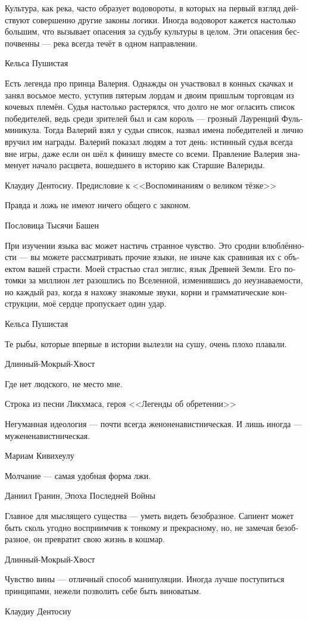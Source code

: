 \documentclass[a4paper,12pt,fleqn]{book}\usepackage{polyglossia}\setdefaultlanguage[babelshorthands=true]{russian}\setotherlanguage{english}\defaultfontfeatures{Ligatures=TeX,Mapping=tex-text}\usepackage{xcolor}\newcommand{\ml}[3]{#2}
\begin{document}
{\epigraph
{Культура, как река, часто образует водовороты, в которых на первый взгляд действуют совершенно другие законы логики.
Иногда водоворот кажется настолько большим, что вызывает опасения за судьбу культуры в целом.
Эти опасения беспочвенны --- река всегда течёт в одном направлении.}
{Кельса Пушистая}

\epigraph
{Есть легенда про принца Валерия.
Однажды он участвовал в конных скачках и занял восьмое место, уступив пятерым лордам и двоим пришлым торговцам из кочевых племён.
Судья настолько растерялся, что долго не мог огласить список победителей, ведь среди зрителей был и сам король --- грозный Лауренций Фульминикула.
Тогда Валерий взял у судьи список, назвал имена победителей и лично вручил им награды.
Валерий показал людям а тот день: истинный судья всегда вне игры, даже если он шёл к финишу вместе со всеми.
Правление Валерия знаменует начало расцвета, вошедшего в историю как Старшие Валериды.}
{Клаудиу Дентосиу.
Предисловие к <<Воспоминаниям о великом тёзке>>}

\epigraph
{Правда и ложь не имеют ничего общего с законом.}
{Пословица Тысячи Башен}

\epigraph
{При изучении языка вас может настичь странное чувство.
Это сродни влюблённости --- вы можете рассматривать прочие языки, не иначе как сравнивая их с объектом вашей страсти.
Моей страстью стал энглис, язык Древней Земли.
Его потомки за миллион лет разошлись по Вселенной, изменившись до неузнаваемости, но каждый раз, когда я нахожу знакомые звуки, корни и грамматические конструкции, моё сердце пропускает один удар.}
{Кельса Пушистая}

\epigraph{Те рыбы, которые впервые в истории вылезли на сушу, очень плохо плавали.}
{Длинный-Мокрый-Хвост}

\epigraph
{Где нет людского, не место мне.}
{Строка из песни Ликхмаса, героя <<Легенды об обретении>>}

\epigraph
{Негуманная идеология --- почти всегда женоненавистническая.
И лишь иногда --- мужененавистническая.}
{Мариам Кивихеулу}

\epigraph
{Молчание --- самая удобная форма лжи.}
{Даниил Гранин, Эпоха Последней Войны}

\epigraph
{Главное для мыслящего существа --- уметь видеть безобразное.
Сапиент может быть сколь угодно восприимчив к тонкому и прекрасному, но, не замечая безобразное, он превратит свою жизнь в кошмар.}
{Длинный-Мокрый-Хвост}

\epigraph
{Чувство вины --- отличный способ манипуляции.
Иногда лучше поступиться принципами, нежели позволить себе быть виноватым.}
{Клаудиу Дентосиу}

}
\end{document}
